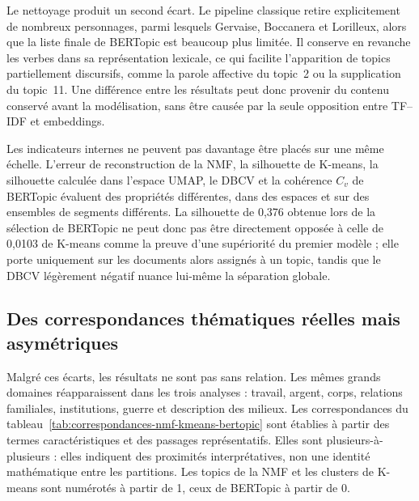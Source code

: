 Le nettoyage produit un second écart. Le pipeline classique retire explicitement de nombreux personnages, parmi lesquels Gervaise, Boccanera et Lorilleux, alors que la liste finale de BERTopic est beaucoup plus limitée. Il conserve en revanche les verbes dans sa représentation lexicale, ce qui facilite l'apparition de topics partiellement discursifs, comme la parole affective du topic~2 ou la supplication du topic~11. Une différence entre les résultats peut donc provenir du contenu conservé avant la modélisation, sans être causée par la seule opposition entre TF--IDF et embeddings.

Les indicateurs internes ne peuvent pas davantage être placés sur une même échelle. L'erreur de reconstruction de la NMF, la silhouette de K-means, la silhouette calculée dans l'espace UMAP, le DBCV et la cohérence \(C_v\) de BERTopic évaluent des propriétés différentes, dans des espaces et sur des ensembles de segments différents. La silhouette de 0,376 obtenue lors de la sélection de BERTopic ne peut donc pas être directement opposée à celle de 0,0103 de K-means comme la preuve d'une supériorité du premier modèle ; elle porte uniquement sur les documents alors assignés à un topic, tandis que le DBCV légèrement négatif nuance lui-même la séparation globale.

\subsection{Des correspondances thématiques réelles mais asymétriques}

Malgré ces écarts, les résultats ne sont pas sans relation. Les mêmes grands domaines réapparaissent dans les trois analyses : travail, argent, corps, relations familiales, institutions, guerre et description des milieux. Les correspondances du tableau~\ref{tab:correspondances-nmf-kmeans-bertopic} sont établies à partir des termes caractéristiques et des passages représentatifs. Elles sont plusieurs-à-plusieurs : elles indiquent des proximités interprétatives, non une identité mathématique entre les partitions. Les topics de la NMF et les clusters de K-means sont numérotés à partir de 1, ceux de BERTopic à partir de 0.

